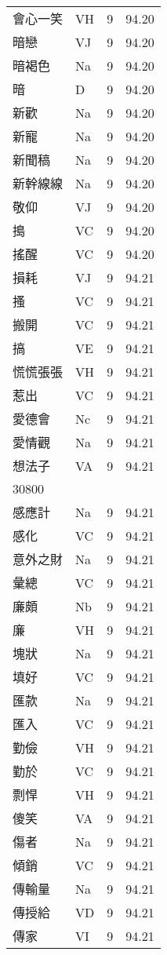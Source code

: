 \documentclass[twocolumn]{book}
\begin{document}
\begin{supertabular}{llrr}
會心一笑 & VH & 9 &  94.20\\
暗戀 & VJ & 9 &  94.20\\
暗褐色 & Na & 9 &  94.20\\
暗 & D & 9 &  94.20\\
新歡 & Na & 9 &  94.20\\
新寵 & Na & 9 &  94.20\\
新聞稿 & Na & 9 &  94.20\\
新幹線線 & Na & 9 &  94.20\\
敬仰 & VJ & 9 &  94.20\\
搗 & VC & 9 &  94.20\\
搖醒 & VC & 9 &  94.20\\
損耗 & VJ & 9 &  94.21\\
搔 & VC & 9 &  94.21\\
搬開 & VC & 9 &  94.21\\
搞 & VE & 9 &  94.21\\
慌慌張張 & VH & 9 &  94.21\\
惹出 & VC & 9 &  94.21\\
愛德會 & Nc & 9 &  94.21\\
愛情觀 & Na & 9 &  94.21\\
想法子 & VA & 9 &  94.21\\
30800\\
感應計 & Na & 9 &  94.21\\
感化 & VC & 9 &  94.21\\
意外之財 & Na & 9 &  94.21\\
彙總 & VC & 9 &  94.21\\
廉頗 & Nb & 9 &  94.21\\
廉 & VH & 9 &  94.21\\
塊狀 & Na & 9 &  94.21\\
填好 & VC & 9 &  94.21\\
匯款 & Na & 9 &  94.21\\
匯入 & VC & 9 &  94.21\\
勤儉 & VH & 9 &  94.21\\
勤於 & VC & 9 &  94.21\\
剽悍 & VH & 9 &  94.21\\
傻笑 & VA & 9 &  94.21\\
傷者 & Na & 9 &  94.21\\
傾銷 & VC & 9 &  94.21\\
傳輸量 & Na & 9 &  94.21\\
傳授給 & VD & 9 &  94.21\\
傳家 & VI & 9 &  94.21\\

\end{supertabular}
\end{document}
